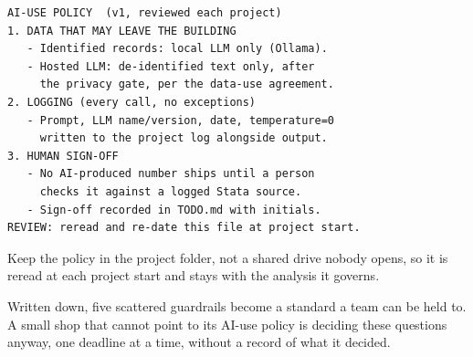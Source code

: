 \documentclass[
    a4paper,
    fontsize=10pt,
    twoside=true,
    numbers=noenddot,
]{kaobook}
\begin{document}
\begin{kaobox}[frametitle={A one-page AI-use policy for a two-person shop}]
\par
{\footnotesize
\begin{verbatim}
AI-USE POLICY  (v1, reviewed each project)
1. DATA THAT MAY LEAVE THE BUILDING
   - Identified records: local LLM only (Ollama).
   - Hosted LLM: de-identified text only, after
     the privacy gate, per the data-use agreement.
2. LOGGING (every call, no exceptions)
   - Prompt, LLM name/version, date, temperature=0
     written to the project log alongside output.
3. HUMAN SIGN-OFF
   - No AI-produced number ships until a person
     checks it against a logged Stata source.
   - Sign-off recorded in TODO.md with initials.
REVIEW: reread and re-date this file at project start.
\end{verbatim}
}
Keep the policy in the project folder, not a shared drive nobody opens, so it is reread at each project start and stays with the analysis it governs.
\end{kaobox}

Written down, five scattered guardrails become a standard a team can be held to. A small shop that cannot point to its AI-use policy is deciding these questions anyway, one deadline at a time, without a record of what it decided.
\end{document}
